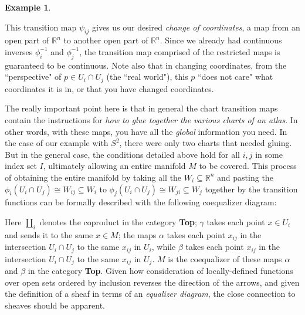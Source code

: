 \documentclass[11pt]{book}
\theoremstyle{definition}
\newtheorem{example}{Example}[section]
\theoremstyle{definition}
\theoremstyle{definition}
\theoremstyle{theorem}
\theoremstyle{definition}
\begin{document}
\begin{example}
\begin{center}
	\end{center} 
	This transition map $\psi_{ij}$ gives us our desired \textit{change of coordinates}, a map from an open part of $\mathbb{R}^n$ to another open part of $\mathbb{R}^n$. Since we already had continuous inverses $\phi_i^{-1}$ and $\phi_j^{-1}$, the transition map comprised of the restricted maps is guaranteed to be continuous. Note also that in changing coordinates, from the ``perspective" of $p \in U_i \cap U_j$ (the ``real world"), this $p$ ``does not care" what coordinates it is in, or that you have changed coordinates.\par
	The really important point here is that in general the chart transition maps contain the instructions for \textit{how to glue together the various charts of an atlas}. In other words, with these maps, you have all the \textit{global} information you need. In the case of our example with $S^2$, there were only two charts that needed gluing. But in the general case, the conditions detailed above hold for all $i,j$ in some index set $I$, ultimately allowing an entire manifold $M$ to be covered. This process of obtaining the entire manifold by taking all the $W_i \subseteq \mathbb{R}^n$ and pasting the $\phi_i(U_i \cap U_j) \cong W_{ij} \subseteq W_i$ to $\phi_j(U_i \cap U_j) \cong W_{ji} \subseteq W_j$ together by the transition functions can be formally described with the following coequalizer diagram: 
	\begin{center}
	\end{center} 
	Here $\coprod_i$ denotes the coproduct in the category \textbf{Top}; $\gamma$ takes each point $x \in U_i$ and sends it to the same $x \in M$; the maps $\alpha$ takes each point $x_{ij}$ in the intersection $U_i \cap U_j$ to the same $x_{ij}$ in $U_i$, while $\beta$ takes each point $x_{ij}$ in the intersection $U_i \cap U_j$ to the same $x_{ij}$ in $U_j$. $M$ is the coequalizer of these maps $\alpha$ and $\beta$ in the category \textbf{Top}. Given how consideration of locally-defined functions over open sets ordered by inclusion reverses the direction of the arrows, and given the definition of a sheaf in terms of an \textit{equalizer diagram}, the close connection to sheaves should be apparent.\par 

\end{example}
\end{document}
